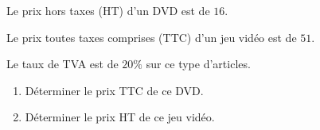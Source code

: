 \begin{exo}{}
	Le prix hors taxes (HT) d'un DVD est de $16$\eur{}.

	Le prix toutes taxes comprises (TTC) d'un jeu vidéo est de $51$\eur{}.

	Le taux de TVA est de $20\%$ sur ce type d'articles.
	\begin{enumerate}
		\item Déterminer le prix TTC de ce DVD.
		\item Déterminer le prix HT de ce jeu vidéo.
	\end{enumerate}
\end{exo}
